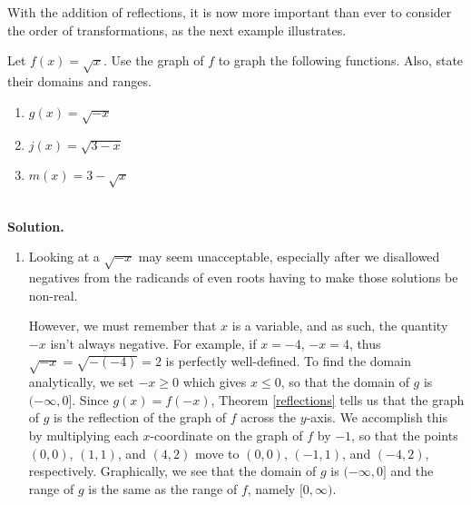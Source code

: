 With the addition of reflections, it is now more important than ever to consider the order of transformations, as the next example illustrates.

\begin{example} Let $f(x) = \sqrt{x}$.  Use the graph of $f$ to graph the following functions.  Also, state their domains and ranges.\\

\begin{multicols}{3}
\begin{enumerate}

\item  $g(x) = \sqrt{-x}$
\item  $j(x) = \sqrt{3-x}$
\item  $m(x) = 3 - \sqrt{x}$

\end{enumerate}
\end{multicols}

~\\
{\bf Solution.}

\begin{enumerate}

\item  Looking at a $\sqrt{-x}$ may seem unacceptable, especially after we disallowed negatives from the radicands of even roots having to make those solutions be non-real.

  However, we must remember that $x$ is a variable, and as such, the quantity $-x$ isn't always negative. For example, if $x=-4$, $-x = 4$, thus $\sqrt{-x} = \sqrt{-(-4)} = 2$ is perfectly well-defined.  To find the domain analytically, we set $-x \geq 0$ which gives  $x \leq 0$, so that the domain of $g$ is $(-\infty, 0]$.  Since $g(x) = f(-x)$, Theorem \ref{reflections} tells us that the graph of $g$ is the reflection of the graph of $f$ across the $y$-axis.  We accomplish this by multiplying each $x$-coordinate on the graph of $f$ by $-1$, so that the points $(0,0)$, $(1,1)$, and $(4,2)$ move to $(0,0)$, $(-1,1)$, and $(-4,2)$, respectively.  Graphically, we see that the domain of $g$ is $(-\infty, 0]$ and the range of $g$ is the same as the range of $f$, namely $[0,\infty)$.

\[ \begin{array}{ccc}


\end{array}\]
\end{enumerate}
\end{example}
